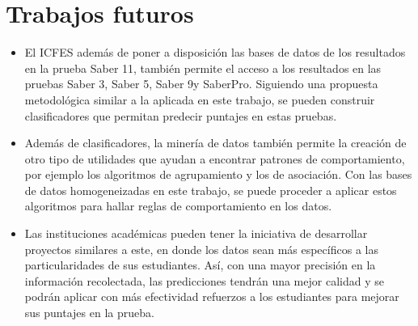 \section{Trabajos futuros}
\begin{itemize}
\item El ICFES además de poner a disposición las bases de datos de los resultados en la prueba Saber 11\degree, también permite el acceso a los resultados en las pruebas Saber 3\degree, Saber 5\degree, Saber 9\degree y SaberPro. Siguiendo una propuesta metodológica similar a la aplicada en este trabajo, se pueden construir clasificadores que permitan predecir puntajes en estas pruebas.

\item Además de clasificadores, la minería de datos también permite la creación de otro tipo de utilidades que ayudan a encontrar patrones de comportamiento, por ejemplo los algoritmos de agrupamiento y los de asociación. Con las bases de datos homogeneizadas en este trabajo, se puede proceder a aplicar estos algoritmos para hallar reglas de comportamiento en los datos.

\item Las instituciones académicas pueden tener la iniciativa de desarrollar proyectos similares a este, en donde los datos sean más específicos a las particularidades de sus estudiantes. Así, con una mayor precisión en la información recolectada, las predicciones tendrán una mejor  calidad y se podrán aplicar con más efectividad refuerzos a los estudiantes para mejorar sus puntajes en la prueba.
\end{itemize}